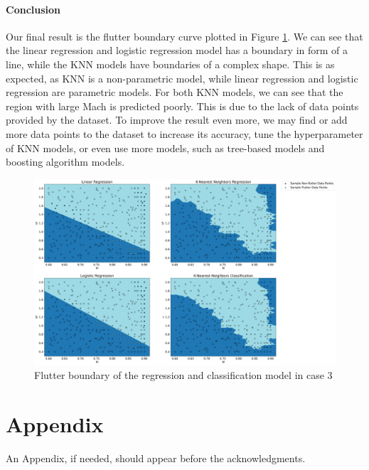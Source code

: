 \documentclass[conf]{new-aiaa}
\begin{document}
\paragraph{Conclusion} Our final result is the flutter boundary curve plotted in Figure \ref{fig:case3_boundary}. We can see that the linear regression and logistic regression model has a boundary in form of a line, while the KNN models have boundaries of a complex shape. This is as expected, as KNN is a non-parametric model, while linear regression and logistic regression are parametric models. For both KNN models, we can see that the region with large Mach is predicted poorly. This is due to the lack of data points provided by the dataset. To improve the result even more, we may find or add more data points to the dataset to increase its accuracy, tune the hyperparameter of KNN models, or even use more models, such as tree-based models and boosting algorithm models. 
\begin{figure}[H]
    \centering
    \includegraphics[width=1.0\textwidth]{graph/case3_boundary.png}
    \caption{Flutter boundary of the regression and classification model in case 3}
    \label{fig:case3_boundary}
\end{figure}

\section*{Appendix}

An Appendix, if needed, should appear before the acknowledgments.
\end{document}
